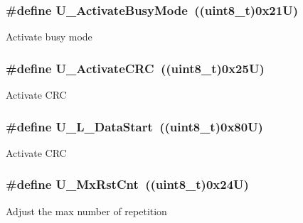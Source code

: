 \subsubsection[{\texorpdfstring{U\+\_\+\+Activate\+Busy\+Mode}{U_ActivateBusyMode}}]{\setlength{\rightskip}{0pt plus 5cm}\#define U\+\_\+\+Activate\+Busy\+Mode~((uint8\+\_\+t)0x21\+U)}\hypertarget{group___u_a_r_t___control___to_ga570dbcb6f3b58812795897e653cf6bcd}{}\label{group___u_a_r_t___control___to_ga570dbcb6f3b58812795897e653cf6bcd}
Activate busy mode 
\subsubsection[{\texorpdfstring{U\+\_\+\+Activate\+C\+RC}{U_ActivateCRC}}]{\setlength{\rightskip}{0pt plus 5cm}\#define U\+\_\+\+Activate\+C\+RC~((uint8\+\_\+t)0x25\+U)}\hypertarget{group___u_a_r_t___control___to_gaa8801c2c6b23ad1b63c85b6f04b08c6d}{}\label{group___u_a_r_t___control___to_gaa8801c2c6b23ad1b63c85b6f04b08c6d}
Activate C\+RC 
\subsubsection[{\texorpdfstring{U\+\_\+\+L\+\_\+\+Data\+Start}{U_L_DataStart}}]{\setlength{\rightskip}{0pt plus 5cm}\#define U\+\_\+\+L\+\_\+\+Data\+Start~((uint8\+\_\+t)0x80\+U)}\hypertarget{group___u_a_r_t___control___to_ga5a6fadacef419bffab0a2ad00d4a4a3a}{}\label{group___u_a_r_t___control___to_ga5a6fadacef419bffab0a2ad00d4a4a3a}
Activate C\+RC 
\subsubsection[{\texorpdfstring{U\+\_\+\+Mx\+Rst\+Cnt}{U_MxRstCnt}}]{\setlength{\rightskip}{0pt plus 5cm}\#define U\+\_\+\+Mx\+Rst\+Cnt~((uint8\+\_\+t)0x24\+U)}\hypertarget{group___u_a_r_t___control___to_ga8898cd82315a21d0365c60b05a9450f9}{}\label{group___u_a_r_t___control___to_ga8898cd82315a21d0365c60b05a9450f9}
Adjust the max number of repetition 
